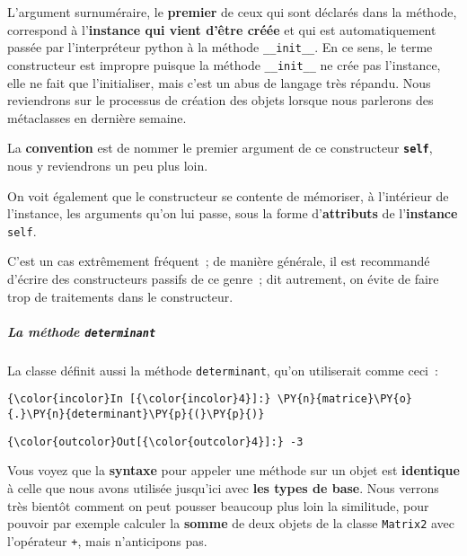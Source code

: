 L'argument surnuméraire, le \textbf{premier} de ceux qui sont déclarés
dans la méthode, correspond à l'\textbf{instance qui vient d'être créée}
et qui est automatiquement passée par l'interpréteur python à la méthode
\texttt{\_\_init\_\_}. En ce sens, le terme constructeur est impropre
puisque la méthode \texttt{\_\_init\_\_} ne crée pas l'instance, elle ne
fait que l'initialiser, mais c'est un abus de langage très répandu. Nous
reviendrons sur le processus de création des objets lorsque nous
parlerons des métaclasses en dernière semaine.

La \textbf{convention} est de nommer le premier argument de ce
constructeur \textbf{\texttt{self}}, nous y reviendrons un peu plus
loin.

    On voit également que le constructeur se contente de mémoriser, à
l'intérieur de l'instance, les arguments qu'on lui passe, sous la forme
d'\textbf{attributs} de l'\textbf{instance} \texttt{self}.

C'est un cas extrêmement fréquent~; de manière générale, il est
recommandé d'écrire des constructeurs passifs de ce genre~; dit
autrement, on évite de faire trop de traitements dans le constructeur.

    \hypertarget{la-muxe9thode-determinant}{%
\subparagraph{\texorpdfstring{La méthode
\texttt{determinant}}{La méthode determinant}}\label{la-muxe9thode-determinant}}

    La classe définit aussi la méthode \texttt{determinant}, qu'on
utiliserait comme ceci~:

    \begin{Verbatim}[commandchars=\\\{\},frame=single,framerule=0.3mm,rulecolor=\color{cellframecolor}]
{\color{incolor}In [{\color{incolor}4}]:} \PY{n}{matrice}\PY{o}{.}\PY{n}{determinant}\PY{p}{(}\PY{p}{)}
\end{Verbatim}


\begin{Verbatim}[commandchars=\\\{\},frame=single,framerule=0.3mm,rulecolor=\color{cellframecolor}]
{\color{outcolor}Out[{\color{outcolor}4}]:} -3
\end{Verbatim}
            
    Vous voyez que la \textbf{syntaxe} pour appeler une méthode sur un objet
est \textbf{identique} à celle que nous avons utilisée jusqu'ici avec
\textbf{les types de base}. Nous verrons très bientôt comment on peut
pousser beaucoup plus loin la similitude, pour pouvoir par exemple
calculer la \textbf{somme} de deux objets de la classe \texttt{Matrix2}
avec l'opérateur \texttt{+}, mais n'anticipons pas.

